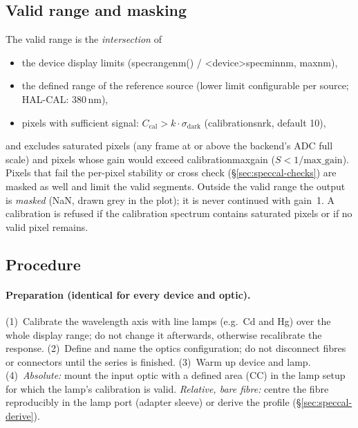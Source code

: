 \documentclass[12pt,a4paper]{article}
\DeclareRobustCommand{\code}[1]{{\ttfamily\small\def\_{\rawus\allowbreak}#1}}
\DeclareRobustCommand{\key}[1]{{\ttfamily\small\color{acc2}\def\_{\rawus\allowbreak}#1}}
\newcommand{\nm}{\,nm}
\begin{document}
\subsection{Valid range and masking}
The valid range is the \emph{intersection} of
\begin{itemize}
  \item the device display limits (\code{spec\_range\_nm()} /
        \key{<device>\_spec\_min\_nm}, \key{\_max\_nm}),
  \item the defined range of the reference source (lower limit configurable per
        source; HAL-CAL: 380\nm),
  \item pixels with sufficient signal: $C_{\mathrm{cal}} > k\cdot\sigma_{\mathrm{dark}}$
        (\key{calibration\_snr\_k}, default 10),
\end{itemize}
and excludes saturated pixels (any frame at or above the backend's ADC full scale)
and pixels whose gain would exceed \key{calibration\_max\_gain}
($S<1/\mathrm{max\_gain}$). Pixels that fail the per-pixel stability or cross
check (\S\ref{sec:speccal-checks}) are masked as well and limit the valid
segments. Outside the valid range the output is \emph{masked}
(NaN, drawn grey in the plot); it is never continued with gain~1. A calibration
is refused if the calibration spectrum contains saturated pixels or if no valid
pixel remains.

\subsection{Procedure}\label{sec:speccal-wizard}
\paragraph{Preparation (identical for every device and optic).}
(1)~Calibrate the wavelength axis with line lamps (e.g.\ Cd and Hg) over the whole
display range; do not change it afterwards, otherwise recalibrate the
response. (2)~Define and name the optics configuration; do not disconnect fibres
or connectors until the series is finished. (3)~Warm up device and lamp.
(4)~\emph{Absolute:} mount the input optic with a defined area (CC) in the
lamp setup for which the lamp's calibration is valid. \emph{Relative, bare
fibre:} centre the fibre reproducibly in the lamp port (adapter sleeve) or derive
the profile (\S\ref{sec:speccal-derive}).
\end{document}

